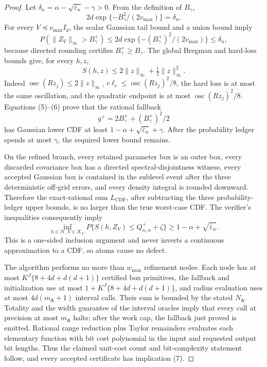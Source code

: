 \documentclass{article}
\begin{document}
\begin{proof}
Let \(\delta_n=\alpha-\sqrt{\overline\varepsilon_n}-\gamma>0\).  From the definition of \(B_\gamma\),
\[
 2d\exp\{-B_\gamma^2/(2v_{\max})\}=\delta_n.
\]
For every \(V\preceq v_{\max}I_d\), the scalar Gaussian tail bound and a union bound imply
\[
 P(\|Z_V\|_\infty>B_\gamma^+)\le
 2d\exp\{-(B_\gamma^+)^2/(2v_{\max})\}\le\delta_n,     \tag{5}
\]
because directed rounding certifies \(B_\gamma^+\ge B_\gamma\).  The global Bregman and hard-loss bounds give, for every \(h,z\),
\[
 S(h,z)\le2\|z\|_\infty+\tfrac12\|z\|_\infty^2.      \tag{6}
\]
Indeed \(\operatorname{osc}(Rz_j)\le2\|z\|_\infty\), \(c\ell_c\le\operatorname{osc}(Rz_j)^2/8\), the hard loss is at most the same oscillation, and the quadratic endpoint is at most \(\operatorname{osc}(Rz_j)^2/8\).  Equations (5)--(6) prove that the rational fallback
\[
 q^+=2B_\gamma^++(B_\gamma^+)^2/2
\]
has Gaussian lower CDF at least \(1-\alpha+\sqrt{\overline\varepsilon_n}+\gamma\).  After the probability ledger spends at most \(\gamma\), the required lower bound remains.

On the refined branch, every retained parameter box is an outer box, every discarded covariance box has a directed spectral-disjointness witness, every accepted Gaussian box is contained in the sublevel event after the three deterministic off-grid errors, and every density integral is rounded downward.  Therefore the exact-rational sum \(L_{\mathrm{CDF}}\), after subtracting the three probability-ledger upper bounds, is no larger than the true worst-case CDF.  The verifier's inequalities consequently imply
\[
 \inf_{h\in\mathcal H,V\in\mathcal K_V}
 P\{S(h,Z_V)\le Q^+_{n,\alpha}+\zeta\}
 \ge1-\alpha+\sqrt{\overline\varepsilon_n}.            \tag{7}
\]
This is a one-sided inclusion argument and never inverts a continuous approximation to a CDF, so atoms cause no defect.

The algorithm performs no more than \(w_{\max}\) refinement nodes.  Each node has at most \(K^J\{8+4d+d(d+1)\}\) certified box primitives, the fallback and initialization use at most \(1+K^J\{8+4d+d(d+1)\}\), and radius evaluation uses at most \(4d(m_{\mathsf A}+1)\) interval calls.  Their sum is bounded by the stated \(N_{\mathsf A}\).  Totality and the width guarantee of the interval oracles imply that every call at precision at most \(m_{\mathsf A}\) halts; after the work cap, the fallback just proved is emitted.  Rational range reduction plus Taylor remainders evaluates each elementary function with bit cost polynomial in the input and requested output bit lengths.  Thus the claimed unit-cost count and bit-complexity statement follow, and every accepted certificate has implication (7).
\end{proof}
\end{document}
